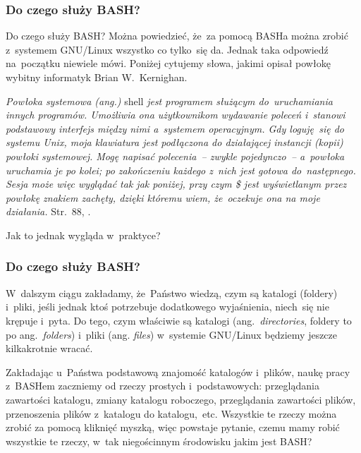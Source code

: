 \documentclass[10pt,t]{beamer}
\begin{document}
\begin{frame}
  \frametitle{Do czego służy BASH?}


  Do czego służy BASH? Można powiedzieć, że~za pomocą BASHa można zrobić
  z~systemem GNU/Linux wszystko co tylko~się da. Jednak taka odpowiedź
  na~początku niewiele mówi. Poniżej cytujemy słowa, jakimi opisał powłokę
  wybitny informatyk Brian W.~Kernighan.

  \textit{Powłoka systemowa (ang.)} shell \textit{jest programem służącym
    do~uruchamiania innych programów. Umożliwia ona użytkownikom wydawanie
    poleceń i~stanowi podstawowy interfejs między nimi a~systemem
    operacyjnym. Gdy loguję~się do systemu Unix, moja klawiatura jest
    podłączona do działającej instancji (kopii) powłoki systemowej.
    Mogę napisać polecenia~-- zwykle pojedynczo~-- a~powłoka uruchamia
    je po kolei; po zakończeniu każdego z~nich jest gotowa do~następnego.
    Sesja może więc wyglądać tak jak poniżej, przy czym \$ jest
    wyświetlanym przez powłokę znakiem zachęty, dzięki któremu wiem,
    że~oczekuje ona na moje działania.} Str.~$88$,
  \parencite{Kernighan-Jak-Unix-tworzyl-historie-Pub-2021}.

  Jak to jednak wygląda w~praktyce?

\end{frame}





\begin{frame}
  \frametitle{Do czego służy BASH?}


  W~dalszym ciągu zakładamy, że~Państwo wiedzą, czym są katalogi (foldery)
  i~pliki, jeśli jednak ktoś potrzebuje dodatkowego wyjaśnienia, niech~się
  nie krępuje i~pyta. Do tego, czym właściwie są katalogi
  (ang.~\textit{directories}, foldery to po ang.~\textit{folders}) i~pliki
  (ang. \textit{files}) w~systemie GNU/Linux będziemy jeszcze kilkakrotnie
  wracać.

  Zakładając u~Państwa podstawową znajomość katalogów i~plików, naukę pracy
  z~BASHem zaczniemy od rzeczy prostych i~podstawowych: przeglądania
  zawartości katalogu, zmiany katalogu roboczego, przeglądania zawartości
  plików, przenoszenia plików z~katalogu do katalogu,~etc. Wszystkie te
  rzeczy można zrobić za pomocą kliknięć myszką, więc powstaje pytanie,
  czemu mamy robić wszystkie te rzeczy, w~tak niegościnnym środowisku jakim
  jest BASH?

\end{frame}
\end{document}
